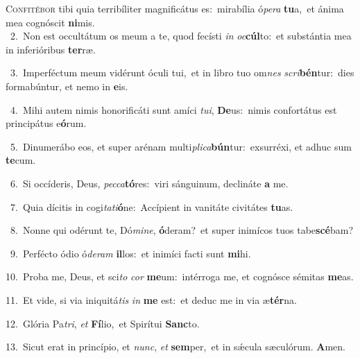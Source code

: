 \lettrine{\initial\textcolor{\initialcolor}{C}}{onfitébor} tibi quia terribíliter magnificátus es:~\dagger mirabília ó\-\textit{pe}\-\textit{ra} \textbf{tu}\-a,~\star et ánima mea cognóscit \textbf{ni}\-mis.\\
{\numbfont\textcolor{\numbcolor}{~2.}}~Non est occultátum os meum a te, quod fecísti \textit{in} \textit{oc}\-\textbf{cúl}to:~\star et substántia mea in inferióribus \textbf{ter}\-ræ.\par
{\numbfont\textcolor{\numbcolor}{~3.}}~Imperféctum meum vidérunt óculi tui,~\dagger et in libro tuo om\textit{nes} \textit{scri}\-\textbf{bén}tur:~\star dies formabúntur, et nemo in \textbf{e}\-is.\par
{\numbfont\textcolor{\numbcolor}{~4.}}~Mihi autem nimis honorificáti sunt amíci \textit{tu}\-\textit{i}, \textbf{De}\-us:~\star nimis confortátus est principátus e\-\textbf{ó}\-rum.\par
{\numbfont\textcolor{\numbcolor}{~5.}}~Dinumerábo eos, et super arénam multi\-\textit{pli}\-\textit{ca}\textbf{bún}tur:~\star exsurréxi, et adhuc sum \textbf{te}\-cum.\par
{\numbfont\textcolor{\numbcolor}{~6.}}~Si occíderis, Deus, \textit{pec}\-\textit{ca}\textbf{tó}res:~\star viri sánguinum, declináte \textbf{a} me.\par
{\numbfont\textcolor{\numbcolor}{~7.}}~Quia dícitis in cogi\-\textit{ta}\-\textit{ti}\textbf{ó}ne:~\star Accípient in vanitáte civitátes \textbf{tu}\-as.\par
{\numbfont\textcolor{\numbcolor}{~8.}}~Nonne qui odérunt te, Dó\-\textit{mi}\-\textit{ne}, \textbf{ó}\-deram?~\star et super inimícos tuos tabe\-\textbf{scé}\-bam?\par
{\numbfont\textcolor{\numbcolor}{~9.}}~Perfécto ódio ó\-\textit{de}\-\textit{ram} \textbf{il}\-los:~\star et inimíci facti sunt \textbf{mi}\-hi.\par
{\numbfont\textcolor{\numbcolor}{10.}}~Proba me, Deus, et sci\textit{to} \textit{cor} \textbf{me}\-um:~\star intérroga me, et cognósce sémitas \textbf{me}\-as.\par
{\numbfont\textcolor{\numbcolor}{11.}}~Et vide, si via iniquitá\textit{tis} \textit{in} \textbf{me} est:~\star et deduc me in via æ\-\textbf{tér}\-na.\par
{\numbfont\textcolor{\numbcolor}{12.}}~Glória Pa\-\textit{tri}\-, \textit{et} \textbf{Fí}\-lio,~\star et Spirítui \textbf{Sanc}\-to.\par
{\numbfont\textcolor{\numbcolor}{13.}}~Sicut erat in princípio, et \textit{nunc}\-, \textit{et} \textbf{sem}\-per,~\star et in sǽcula sæculórum. \textbf{A}\-men.\par
